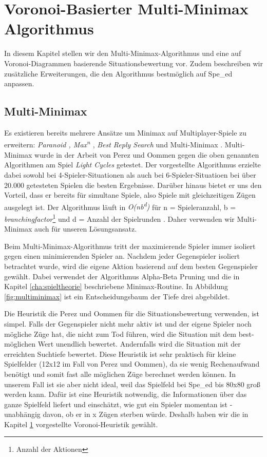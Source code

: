 \chapter{Voronoi-Basierter Multi-Minimax Algorithmus}
\label{cha:voronoi}

In diesem Kapitel stellen wir den Multi-Minimax-Algorithmus und eine auf Voronoi-Diagrammen basierende Situationsbewertung vor. Zudem beschreiben wir zusätzliche Erweiterungen, die den Algorithmus bestmöglich auf Spe\_ed anpassen.

\section{Multi-Minimax}

Es existieren bereits mehrere Ansätze um Minimax auf Multiplayer-Spiele zu erweitern: \textit{Paranoid \cite{Sturtevant.2006}, Max\textsuperscript{n} \cite{.1986}}, \textit{Best Reply Search} \cite{Schadd.2011} und Multi-Minimax \cite{Perez.2019}. Multi-Minimax wurde in der Arbeit von Perez und Oommen gegen die oben genannten Algorithmen am Spiel \textit{Light Cycles} getestet. Der vorgestellte Algorithmus erzielte dabei sowohl bei 4-Spieler-Situationen als auch bei 6-Spieler-Situatioen bei über 20.000 getesteten Spielen die besten Ergebnisse. Darüber hinaus bietet er uns den Vorteil, dass er bereits für simultane Spiele, also Spiele mit gleichzeitigen Zügen ausgelegt ist. Der Algorithmus läuft in \textit{O(nb\textsuperscript{d})} für n = Spieleranzahl, b = \textit{branchingfactor}\footnote{Anzahl der Aktionen} und d = Anzahl der Spielrunden \cite{Perez.2019}. Daher verwenden wir Multi-Minimax auch für unseren Lösungsansatz.

Beim Multi-Minimax-Algorithmus tritt der maximierende Spieler immer isoliert gegen einen minimierenden Spieler an. Nachdem jeder Gegenspieler isoliert betrachtet wurde, wird die eigene Aktion basierend auf dem besten Gegenspieler gewählt. Dabei verwendet der Algorithmus Alpha-Beta Pruning und die in Kapitel \ref{cha:spieltheorie} beschriebene Minimax-Routine. In Abbildung \ref{fig:multiminimax} ist ein Entscheidungsbaum der Tiefe drei abgebildet.

Die Heuristik die Perez und Oommen für die Situationsbewertung verwenden, ist simpel. Falls der Gegenspieler nicht mehr aktiv ist und der eigene Spieler noch mögliche Züge hat, die nicht zum Tod führen, wird die Situation mit dem best-möglichen Wert unendlich bewertet. Andernfalls wird die Situation mit der erreichten Suchtiefe bewertet. Diese Heuristik ist sehr praktisch für kleine Spielfelder (12x12 im Fall von Perez und Oommen), da sie wenig Rechenaufwand benötigt und somit fast alle möglichen Züge berechnet werden können. In unserem Fall ist sie aber nicht ideal, weil das Spielfeld bei Spe\_ed bis 80x80 groß werden kann. Dafür ist eine Heuristik notwendig, die Informationen über das ganze Spielfeld liefert und einschätzt, wie gut ein Spieler momentan ist - unabhängig davon, ob er in x Zügen sterben würde. Deshalb haben wir die in Kapitel \ref{cha:voronoi} vorgestellte Voronoi-Heuristik gewählt.

